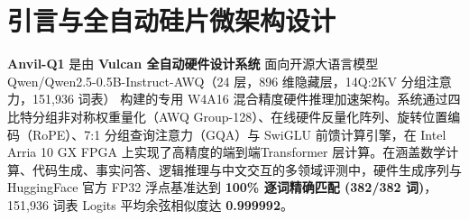 \documentclass[11pt,a4paper]{article}
\begin{document}
\section{引言与全自动硅片微架构设计}

\textbf{Anvil-Q1} 是由 \textbf{Vulcan 全自动硬件设计系统} 面向开源大语言模型 Qwen/\allowbreak{}Qwen2.5-0.5B-Instruct-AWQ（24 层，896 维隐藏层，14Q:2KV 分组注意力，151,\allowbreak{}936 词表） 构建的专用 W4A16 混合精度硬件推理加速架构。系统通过四比特分组非对称权重量化（AWQ Group-128）、在线硬件反量化阵列、旋转位置编码（RoPE）、7:1 分组查询注意力（GQA）与 SwiGLU 前馈计算引擎，在 Intel Arria 10 GX FPGA 上实现了高精度的端到端Transformer 层计算。在涵盖数学计算、代码生成、事实问答、逻辑推理与中文交互的多领域评测中，硬件生成序列与 HuggingFace 官方 FP32 浮点基准达到 \textbf{100\% 逐词精确匹配 (\allowbreak{}382/\allowbreak{}382 词)\allowbreak{}}，151,936 词表 Logits 平均余弦相似度达 \textbf{0.999992}。

\vspace{2pt}
\end{document}
